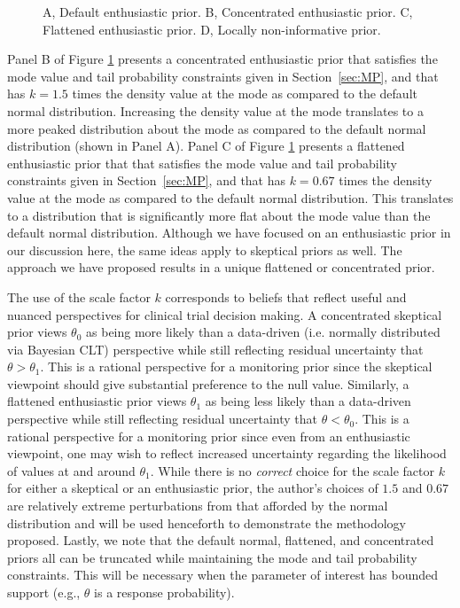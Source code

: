 \documentclass[AMA,STIX1COL,doublespace]{WileyNJD-v2}
\begin{document}
\begin{figure}
\begin{center}
\caption{A, Default enthusiastic prior. B, Concentrated enthusiastic prior. C, Flattened enthusiastic prior. D, Locally non-informative prior.}

\label{fig:figure1}
\end{center}
\end{figure}

{Panel B of Figure \ref{fig:figure1} presents a concentrated enthusiastic prior that satisfies 
the mode value and tail probability constraints given in Section~\ref{sec:MP}, and that has $k=1.5$ times the density value at the mode as compared to the default normal distribution. 
Increasing the density value at the mode translates to a more peaked distribution about the mode as compared to the default normal distribution (shown in Panel A). 
%
Panel C of Figure \ref{fig:figure1} presents a flattened enthusiastic prior that that satisfies the mode value and tail probability constraints given in Section~\ref{sec:MP}, and
that has $k=0.67$ times the density value at the mode as compared to the default normal distribution. This translates to a distribution that is significantly more flat about the mode value than the default normal distribution. 
%
Although we have focused on an enthusiastic prior in our discussion here, the same ideas apply to skeptical priors as well.
%
The approach we have proposed results in a unique flattened or concentrated prior.

The use of the scale factor $k$ corresponds to beliefs that reflect useful and nuanced perspectives for clinical trial decision making.
%
A concentrated skeptical prior views $\theta_0$ as being more likely than a data-driven (i.e. normally distributed via Bayesian CLT) perspective while still reflecting residual uncertainty that $\theta>\theta_1$.
%
This is a rational perspective for a monitoring prior since the skeptical viewpoint should give substantial preference to the null value.
%
Similarly, a flattened enthusiastic prior views $\theta_1$ as being less likely than a data-driven perspective while still reflecting residual uncertainty that $\theta<\theta_0$.
%
This is a rational perspective for a monitoring prior since even from an enthusiastic viewpoint, one may wish to reflect increased uncertainty regarding the likelihood of values at and around $\theta_1$.
%
While there is no \textit{correct} choice for the scale factor $k$ for either a skeptical or an enthusiastic prior, the author's choices
of $1.5$ and $0.67$ are relatively extreme perturbations from that afforded by the normal distribution and will be used henceforth to 
demonstrate the methodology proposed. 
Lastly, we note that the default normal, flattened, and concentrated priors all can be truncated while maintaining the mode and tail 
probability constraints.
This will be necessary when the parameter of interest has bounded support (e.g., $\theta$ is a response probability).
}
\end{document}
